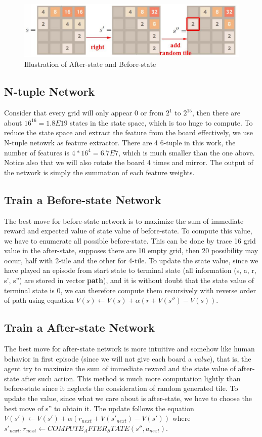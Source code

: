 \documentclass[12pt,a4paper]{article}
\begin{document}
\begin{figure}[hbt]
\centering
\includegraphics[scale=0.2]{before_after.png}
\caption{Illustration of After-state and Before-state}
\label{fig:after_before}
\end{figure}

\subsection{N-tuple Network}
Consider that every grid will only appear 0 or from $2^1$ to $2^{15}$, then there are 
about $16^{16} = 1.8E19$ states in the state space, which is too huge to compute. 
To reduce the state space and extract the feature from the board effectively, we use
N-tuple netowrk as feature extractor. There are 4 6-tuple in this work, the number of features is $4*16^4 = 6.7E7$, which is much smaller than the one above. Notice also that we will also rotate the board 4 times and mirror. The output of the network is simply the summation of each feature weights.

\subsection{Train a Before-state Network}
The best move for before-state network is to maximize the sum of immediate reward and expected value of state value of before-state. To compute this value, we have to enumerate all possible before-state. This can be done by trace 16 grid value in the after-state, supposes there are 10 empty grid, then 20 possibility may occur, half with 2-tile and the other for 4-tile. To update the state value, since we have played an episode from start state to terminal state (all information (s, a, r, s', s'') are stored in vector \textbf{path}), and it is without doubt that the state value of terminal state is 0, we can therefore compute them recursively with reverse order of path using equation $V(s) \leftarrow V(s) + \alpha (r+V(s'')-V(s))$.

\subsection{Train a After-state Network}
The best move for after-state network is more intuitive and somehow like human behavior in first episode (since we will not give each board a \textit{value}), that is, the agent try to maximize the sum of immediate reward and the state value of after-state after such action. This method is much more computation lightly than before-state since it neglects the consideration of random generated tile. To update the value, since what we care about is after-state, we have to choose the best move of s'' to obtain it. The update follows the equation $V(s') \leftarrow V(s') + \alpha (r_{next} + V(s'_{next}) -V(s'))$ where $s'_{next}, r_{next} \leftarrow COMPUTE_AFTER_STATE(s'', a_{next})$.
\end{document}
